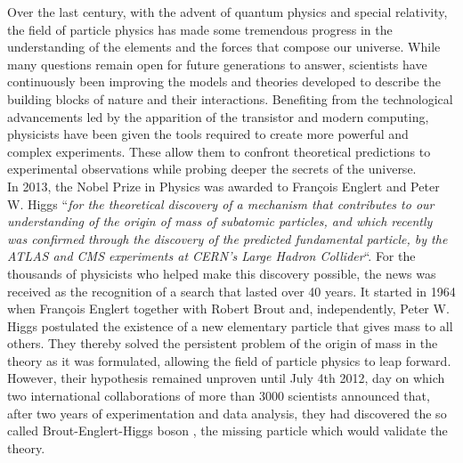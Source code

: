 Over the last century, with the advent of quantum physics and special relativity, the field of particle physics has made some tremendous progress in the understanding of the elements and the forces that compose our universe. While many questions remain open for future generations to answer, scientists have continuously been improving the models and theories developed to describe the building blocks of nature and their interactions. Benefiting from the technological advancements led by the apparition of the transistor and modern computing, physicists have been given the tools required to create more powerful and complex experiments. These allow them to confront theoretical predictions to experimental observations while probing deeper the secrets of the universe. \\

In 2013, the Nobel Prize in Physics was awarded to Fran\c{c}ois Englert and Peter W. Higgs ``\textit{for the theoretical discovery of a mechanism that contributes to our understanding of the origin of mass of subatomic particles, and which recently was confirmed through the discovery of the predicted fundamental particle, by the ATLAS and CMS experiments at CERN's Large Hadron Collider}``. For the thousands of physicists who helped make this discovery possible, the news was received as the recognition of a search that lasted over 40 years. It started in 1964 when Fran\c{c}ois Englert together with Robert Brout \cite{PhysRevLett.13.321} and, independently, Peter W. Higgs \cite{PhysRevLett.13.508} postulated the existence of a new elementary particle that gives mass to all others. They thereby solved the persistent problem of the origin of mass in the theory as it was formulated, allowing the field of particle physics to leap forward. However, their hypothesis remained unproven until July 4th 2012, day on which two international collaborations of more than 3000 scientists announced that, after two years of experimentation and data analysis, they had discovered the so called Brout-Englert-Higgs boson \cite{PhysRevLett.114.191803}, the missing particle which would validate the theory. \\

